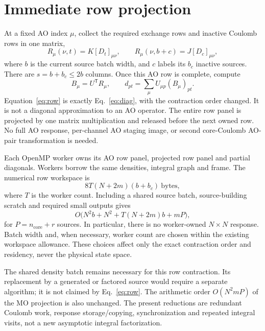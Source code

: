 \documentclass[11pt,a4paper]{article}
\newcommand{\T}{^{\mathsf T}}
\begin{document}
\section{Immediate row projection}

At a fixed AO index $\mu$, collect the required exchange rows and inactive
Coulomb rows in one matrix,
\begin{equation}
 R_\mu(\nu,t)=K[D_t]_{\mu\nu},\qquad
 R_\mu(\nu,b+c)=J[D_c]_{\mu\nu},
\end{equation}
where $b$ is the current source batch width, and $c$ labels its $b_c$
inactive sources. There are $s=b+b_c\leq2b$ columns. Once this AO row is
complete, compute
\begin{equation}\label{eq:row}
 B_\mu=U\T R_\mu,\qquad
 d_{pt}=\sum_\mu U_{\mu p}(B_\mu)_{pt}.
\end{equation}
Equation~\eqref{eq:row} is exactly Eq.~\eqref{eq:diag}, with the contraction
order changed. It is not a diagonal approximation to an AO operator.
The entire row panel is projected by one matrix multiplication and released
before the next owned row. No full AO response, per-channel AO staging
image, or second core-Coulomb AO-pair transformation is needed.

Each OpenMP worker owns its AO row panel, projected row panel and partial
diagonals. Workers borrow the same densities, integral graph and frame.
The numerical row workspace is
\begin{equation}\label{eq:memory}
 8T(N+2m)(b+b_c)\ \text{bytes},
\end{equation}
where $T$ is the worker count. Including a shared source batch, source-building
scratch and required small outputs gives
\begin{equation}
 O\bigl(N^2b+N^2+T(N+2m)b+mP\bigr),
\end{equation}
for $P=n_{\mathrm{core}}+r$ sources. In particular, there is no worker-owned
$N\times N$ response. Batch width and, when necessary, worker count are
chosen within the existing workspace allowance. These choices affect only
the exact contraction order and residency, never the physical state space.

The shared density batch remains necessary for this row contraction.
Its replacement by a generated or factored source would require a separate
algorithm; it is not claimed by Eq.~\eqref{eq:row}. The arithmetic order
$O(N^2mP)$ of the MO projection is also unchanged. The present reductions
are redundant Coulomb work, response storage/copying, synchronization and
repeated integral visits, not a new asymptotic integral factorization.
\end{document}
